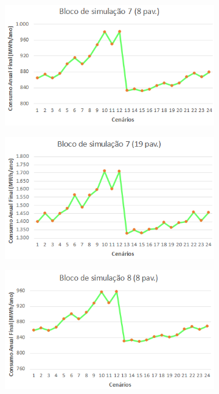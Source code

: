 \begin{figure}[H]
    \centering
    \caption{Bloco de simulações de protetores solares dos modelos genérico de 8 (esq.) e 19 pavimentos (dir.).}
    \begin{subfigure}[b]{0.49\textwidth}
        \includegraphics[width=\textwidth]{figures/result/fig35-bloco7.png}
    \end{subfigure}
    \begin{subfigure}[b]{0.49\textwidth}
        \includegraphics[width=\textwidth]{figures/result/fig36-bloco7.png}
    \end{subfigure}
    \begin{subfigure}[b]{0.49\textwidth}
        \includegraphics[width=\textwidth]{figures/result/fig37-bloco8.png}

\end{subfigure}
\end{figure}
